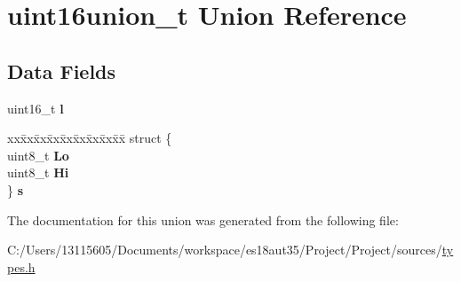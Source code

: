 \hypertarget{unionuint16union__t}{}\section{uint16union\+\_\+t Union Reference}
\label{unionuint16union__t}
\subsection*{Data Fields}
\begin{DoxyCompactItemize}
\item 
\hypertarget{unionuint16union__t_a99ee3a3f73300849c180c387230c7caa}{}uint16\+\_\+t {\bfseries l}\label{unionuint16union__t_a99ee3a3f73300849c180c387230c7caa}

\item 
\hypertarget{unionuint16union__t_ac6f9f8af6752db7d702f5f07f3de9523}{}\begin{tabbing}
xx\=xx\=xx\=xx\=xx\=xx\=xx\=xx\=xx\=\kill
struct \{\\
\>uint8\_t {\bfseries Lo}\\
\>uint8\_t {\bfseries Hi}\\
\} {\bfseries s}\label{unionuint16union__t_ac6f9f8af6752db7d702f5f07f3de9523}
\\

\end{tabbing}\end{DoxyCompactItemize}


The documentation for this union was generated from the following file\+:\begin{DoxyCompactItemize}
\item 
C\+:/\+Users/13115605/\+Documents/workspace/es18aut35/\+Project/\+Project/sources/\hyperlink{types_8h}{types.\+h}\end{DoxyCompactItemize}
